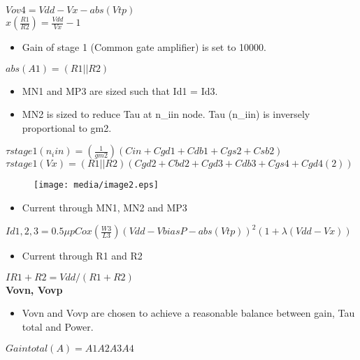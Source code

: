 \documentclass[12pt,a4paper]{article}
\begin{document}
$Vov4=Vdd-Vx-abs(Vtp) $\\


$x (\frac{R1}{R2})=\frac{Vdd}{Vx}-1 $\\


\begin{itemize}
\item Gain of stage 1 (Common gate amplifier) is set to 10000.
\end{itemize}
$abs(A1)=(R1 || R2) $\\


\begin{itemize}
\item MN1 and MP3 are sized such that Id1 = Id3.
\end{itemize}


\begin{itemize}
\item MN2 is sized to reduce Tau at n\_iin node. Tau (n\_iin) is 
inversely proportional to gm2.
\end{itemize}
$\tau stage1 (n_iin)=(\frac{1}{gm2})(Cin+Cgd1+Cdb1+Cgs2+Csb2)$\\


$\tau stage1 (Vx)=(R1 || R2)(Cgd2+Cbd2+Cgd3+Cdb3+Cgs4+Cgd4 (2))$\\




\begin{figure}[h]
\centering
\texttt{[image: media/image2.eps]}
\end{figure}


\begin{itemize}
\item Current through MN1, MN2 and MP3
\end{itemize}
$Id1,2,3=0.5\mu pCox(\frac{W3}{L3})(Vdd-VbiasP-abs(Vtp))^{2} (1+\lambda 
(Vdd-Vx))$\\


\begin{itemize}
\item Current through R1 and R2
\end{itemize}
$IR1+R2=Vdd/(R1+R2)$\\


\textbf{Vovn, Vovp}

\begin{itemize}
\item Vovn and Vovp are chosen to achieve a reasonable balance between 
gain, Tau total and Power.
\end{itemize}
$Gain total (A)=A1A2A3A4$\\
\end{document}
